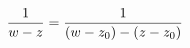 \documentclass[preview]{standalone}
\begin{document}
\begin{align*}
\special{dvisvgm:raw <g id='unique000'>}\frac{1}{w-z} = \frac{1}{(w-z_0)-(z-z_0)}\special{dvisvgm:raw </g>}
\end{align*}
\end{document}
